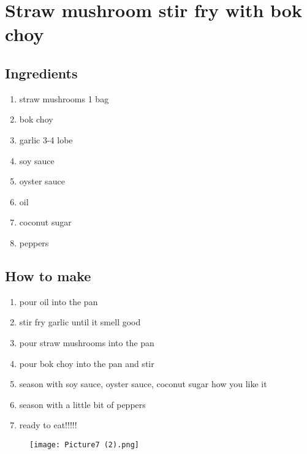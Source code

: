 \section{Straw mushroom stir fry with bok choy}
\subsection{Ingredients}
\begin{enumerate}
    \item straw mushrooms  1 bag
    \item bok choy
    \item garlic  3-4 lobe
    \item soy sauce
    \item oyster sauce
    \item oil
    \item coconut sugar
    \item peppers
\end{enumerate}
\subsection{How to make}
\begin{enumerate}
    \item pour oil into the pan
    \item stir fry garlic until it smell good
    \item pour straw mushrooms into the pan
    \item pour bok choy into the pan and stir
    \item season with soy sauce, oyster sauce, coconut sugar how you like it
    \item season with a little bit of peppers
    \item ready to eat!!!!!
\end{enumerate}
\begin{figure}[h]
    \texttt{[image: Picture7 (2).png]}
\end{figure}